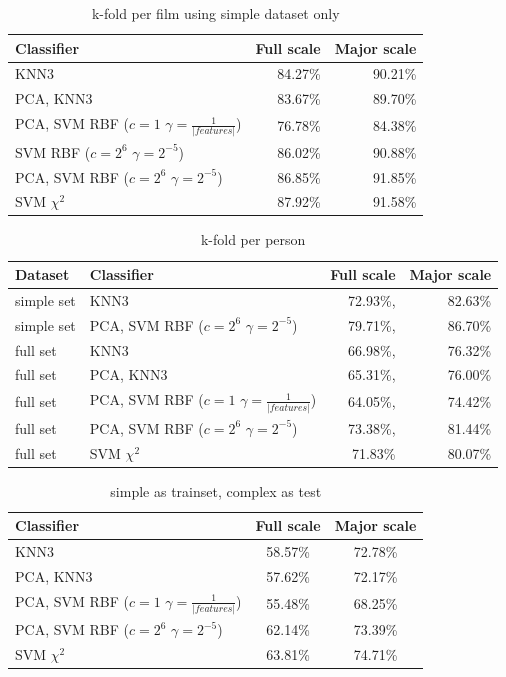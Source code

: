 \begin{table}
\centering
\begin{tabular}{lrr}
\hline\hline
Classifier 				&  	Full scale	& Major scale	\\
\hline
KNN3 		&  	84.27\%		& 90.21\%		\\
PCA, KNN3 	& 	83.67\%		& 89.70\%		\\
PCA, SVM RBF ($c=1$ $\gamma=\frac{1}{|features|}$)	& 	76.78\%		& 84.38\%		\\
SVM RBF ($c=2^6$ $\gamma=2^{-5}$) & 86.02\% & 90.88\% \\
PCA, SVM RBF ($c=2^6$ $\gamma=2^{-5}$) &  86.85\% & 91.85\% \\
SVM $\chi^2$ & 87.92\% 		& 91.58\% \\
\hline
\end{tabular}
\caption{k-fold per film using simple dataset only}
\end{table}


\begin{table}
\centering
\begin{tabular}{llrr}
\hline\hline
Dataset & Classifier 				&  	Full scale	& Major scale	\\
\hline
simple set	& KNN3	& 72.93\%, & 82.63\%	\\
simple set	& PCA, SVM RBF ($c=2^6$ $\gamma=2^{-5}$) & 79.71\%, & 86.70\%	\\
full set	& KNN3 & 66.98\%, & 76.32\%	\\
full set	& PCA, KNN3 & 65.31\%, & 76.00\%	\\
full set	& PCA, SVM RBF ($c=1$ $\gamma=\frac{1}{|features|}$) & 64.05\%, & 74.42\%	\\
full set	& PCA, SVM RBF ($c=2^6$ $\gamma=2^{-5}$)& 73.38\%, & 81.44\%	\\
full set    & SVM $\chi^2$ &  71.83\% &80.07\% \\
\hline
\end{tabular}
\caption{k-fold per person}
\end{table}


\begin{table}
\centering
\begin{tabular}{lcc}
\hline\hline
Classifier 				&  	Full scale	&	Major scale	\\
\hline
KNN3					&	58.57\% 	&	72.78\%	\\
PCA, KNN3 				&	57.62\% 	&	72.17\%	\\
PCA, SVM RBF ($c=1$ $\gamma=\frac{1}{|features|}$)	& 55.48\%	&	68.25\%	\\
PCA, SVM RBF ($c=2^6$ $\gamma=2^{-5}$)				& 62.14\%	&	73.39\%	\\
SVM $\chi^2$ 			&	63.81\%		&	74.71\%	\\
\hline
\end{tabular}
\caption{simple as trainset, complex as test}
\end{table}



